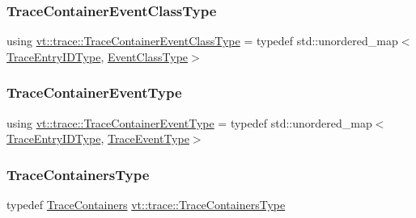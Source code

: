 \subsubsection{\texorpdfstring{Trace\+Container\+Event\+Class\+Type}{TraceContainerEventClassType}}
{\footnotesize\ttfamily using \hyperlink{namespacevt_1_1trace_a352c8799ee88afa3f1b7008952ed8485}{vt\+::trace\+::\+Trace\+Container\+Event\+Class\+Type} = typedef std\+::unordered\+\_\+map$<$\hyperlink{namespacevt_1_1trace_a3c14050715ba9eceaeff51fb3de64f2f}{Trace\+Entry\+I\+D\+Type}, \hyperlink{namespacevt_1_1trace_afc5456ac95b0d3e9bb63a21597f5660c}{Event\+Class\+Type}$>$}

\mbox{\label{namespacevt_1_1trace_a80118aaa48fed940af3899800bba2303}} 
\subsubsection{\texorpdfstring{Trace\+Container\+Event\+Type}{TraceContainerEventType}}
{\footnotesize\ttfamily using \hyperlink{namespacevt_1_1trace_a80118aaa48fed940af3899800bba2303}{vt\+::trace\+::\+Trace\+Container\+Event\+Type} = typedef std\+::unordered\+\_\+map$<$\hyperlink{namespacevt_1_1trace_a3c14050715ba9eceaeff51fb3de64f2f}{Trace\+Entry\+I\+D\+Type}, \hyperlink{namespacevt_1_1trace_a79b7fa947245c08d04a3ea67fbff2c30}{Trace\+Event\+Type}$>$}

\mbox{\label{namespacevt_1_1trace_aaddb48ba5ca26191fce6c8565b662322}} 
\subsubsection{\texorpdfstring{Trace\+Containers\+Type}{TraceContainersType}}
{\footnotesize\ttfamily typedef \hyperlink{classvt_1_1trace_1_1_trace_containers}{Trace\+Containers} \hyperlink{namespacevt_1_1trace_aaddb48ba5ca26191fce6c8565b662322}{vt\+::trace\+::\+Trace\+Containers\+Type}}

\mbox{\label{namespacevt_1_1trace_a3c14050715ba9eceaeff51fb3de64f2f}} 

